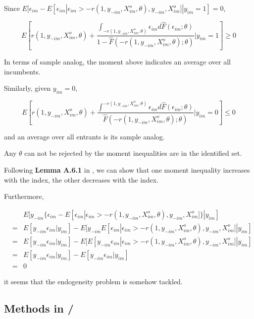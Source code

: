 \documentclass[a4paper]{article}
\begin{document}
Since $ E[\epsilon_{im} - E[\epsilon_{im}|\epsilon_{im} > -r(1,y_{-im},X^o_{im},\theta), y_{-im}, X^o_{im}]|y_{im} = 1] = 0$,


$$E[r(1,y_{-im},X^o_{im},\theta) + \dfrac{\int_{-r(1,y_{-im},X^o_{im},\theta)} \epsilon_{im}d\hat{F}(\epsilon_{im}; \theta)}{1 - \hat{F}(-r(1,y_{-im},X^o_{im},\theta); \theta)} | y_{im} = 1] \geq 0$$

In terms of sample analog, the moment above indicates an average over all incumbents.

\bigskip

Similarly, given $y_{im} = 0$,

$$E[r(1,y_{-im},X^o_{im},\theta) + \dfrac{\int^{-r(1,y_{-im},X^o_{im},\theta)} \epsilon_{im}d\hat{F}(\epsilon_{im};\theta)}{ \hat{F}(-r(1,y_{-im},X^o_{im},\theta); \theta)} | y_{im} = 0] \leq 0$$

and an average over all entrants is its sample analog.

\bigskip

Any $\theta$ can not be rejected by the moment inequalities are in the identified set.

\bigskip

Following \textbf{Lemma A.6.1} in \cite{dickstein2013accounting}, we can show that one moment inequality increases with the index, the other decreases with the index.

\bigskip

Furthermore,

$$
\begin{array}{rcl}
& & E[y_{-im}\{ \epsilon_{im} - E[\epsilon_{im}|\epsilon_{im} > -r(1,y_{-im},X^o_{im},\theta), y_{-im}, X^o_{im}] \} | y_{im}] \\
&=& E[y_{-im}\epsilon_{im}|y_{im}] - E[y_{-im}E[\epsilon_{im}|\epsilon_{im} > -r(1,y_{-im},X^o_{im},\theta), y_{-im}, X^o_{im}] | y_{im}] \\ 
&=& E[y_{-im}\epsilon_{im}|y_{im}] - E[E[y_{-im}\epsilon_{im}|\epsilon_{im} > -r(1,y_{-im},X^o_{im},\theta), y_{-im}, X^o_{im}] | y_{im}] \\
&=& E[y_{-im}\epsilon_{im}|y_{im}] - E[y_{-im}\epsilon_{im}|y_{im}] \\
&=& 0 
\end{array}
$$

it seems that the endogeneity problem is somehow tackled. 

\subsection{Methods in \cite{dickstein2013accounting}/\cite{illanes2016switching}\cite{uetake2014estimating}}
\end{document}
